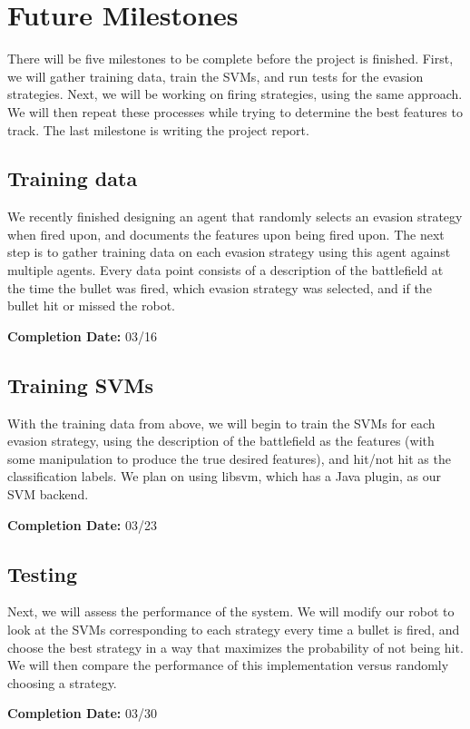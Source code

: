 \documentclass{article}
\theoremstyle{plain}
\theoremstyle{definition}
\theoremstyle{remark}
\begin{document}
\section{Future Milestones}
There will be five milestones to be complete before the project is finished. First, we will gather training data, train the SVMs, and run tests for the evasion strategies. Next, we will be working on firing strategies, using the same approach. We will then repeat these processes while trying to determine the best features to track. The last milestone is writing the project report.

\subsection*{Training data}
We recently finished designing an agent that randomly selects an evasion strategy when fired upon, and documents the features upon being fired upon. The next step is to gather training data on each evasion strategy using this agent against multiple agents. Every data point consists of a description of the battlefield at the time the bullet was fired, which evasion strategy was selected, and if the bullet hit or missed the robot.

{\bf Completion Date:}  03/16

\subsection*{Training SVMs}
With the training data from above, we will begin to train the SVMs for each evasion strategy, using the description of the battlefield as the features (with some manipulation to produce the true desired features), and hit/not hit as the classification labels. We plan on using libsvm, which has a Java plugin, as our SVM backend.

{\bf Completion Date:}   03/23

\subsection*{Testing}
Next, we will assess the performance of the system. We will modify our robot to look at the SVMs corresponding to each strategy every time a bullet is fired, and choose the best strategy in a way that maximizes the probability of not being hit. We will then compare the performance of this implementation versus randomly choosing a strategy.

{\bf Completion Date:}  03/30
\end{document}
